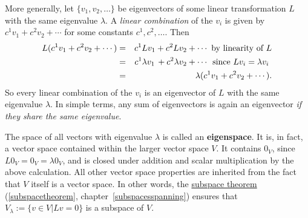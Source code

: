 More generally, let $\{ v_1, v_2, \ldots \}$ be eigenvectors of some linear transformation $L$ with the same eigenvalue $\lambda$.  A \emph{linear combination} of the $v_i$ is given by $c^1v_1+c^2v_2+\cdots$ for some constants $c^1, c^2,\ldots$.  Then
\begin{eqnarray*}
L(c^1v_1+c^2v_2+\cdots) &=& c^1Lv_1+c^2Lv_2+\cdots \text{ by linearity of $L$}\\
&=& c^1\lambda v_1\,+c^2\lambda v_2+\cdots \hspace{.5mm} \text{ since $Lv_i=\lambda v_i$ }\\
&=& \lambda (c^1v_1+c^2v_2+\cdots).
\end{eqnarray*}
So every linear combination of the $v_i$ is an eigenvector of $L$ with the same eigenvalue $\lambda$.
In simple terms, any sum of eigenvectors is again an eigenvector {\itshape if they share the same eigenvalue}.

The space of all vectors with eigenvalue $\lambda$ is called an {\bf eigenspace}.  It is, in fact, a vector space contained within the larger vector space $V$.  It contains $0_V$, since $L0_V=0_V=\lambda 0_V$, and is closed under addition and scalar multiplication by the above calculation.  All other vector space properties are inherited from the fact that $V$ itself is a vector space. In other words, the \hyperlink{sst}{subspace theorem} (\ref{subspacetheorem}, chapter~\ref{subspacesspanning}) ensures that $V_\lambda:=\{v\in V|Lv=0\}$ is a subspace of $V$.




